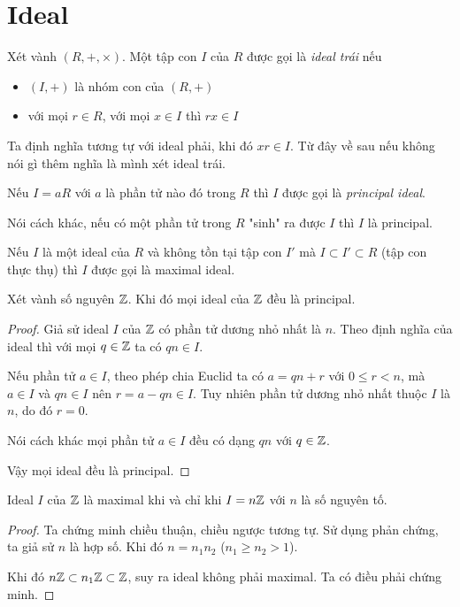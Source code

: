 \section{Ideal}

\begin{definition}[Ideal]
    Xét vành $(R, +, \times)$. Một tập con $I$ của $R$ được gọi là 
    \textit{ideal trái} nếu
    \begin{itemize}
        \item $(I, +)$ là nhóm con của $(R, +)$
        \item với mọi $r \in R$, với mọi $x \in I$ thì $rx \in I$
    \end{itemize}
\end{definition}

Ta định nghĩa tương tự với ideal phải, khi đó $xr \in I$.
Từ đây về sau nếu không nói gì thêm nghĩa là mình xét ideal trái.

\begin{definition}
    Nếu $I = aR$ với $a$ là phần tử nào đó trong $R$ thì $I$ được gọi 
    là  \textit{principal ideal}.
\end{definition}

Nói cách khác, nếu có một phần tử trong $R$ "sinh" ra được $I$ thì 
$I$ là principal.

\begin{definition}
    Nếu $I$ là một ideal của $R$ và không tồn tại tập con $I'$ mà 
    $I \subset I' \subset R$ (tập con thực thụ) thì $I$ được gọi
    là maximal ideal.
\end{definition}

\begin{corollary}
    Xét vành số nguyên $\mathbb{Z}$. Khi đó mọi ideal của $\mathbb{Z}$ đều là principal.
\end{corollary}

\begin{proof}
    Giả sử ideal $I$ của $\mathbb{Z}$ có phần tử dương nhỏ nhất là $n$.
    Theo định nghĩa của ideal thì với mọi $q \in \mathbb{Z}$ ta có 
    $qn \in I$.

    Nếu phần tử $a \in I$, theo phép chia Euclid ta có $a = qn + r$
    với $0 \leq r < n$, mà $a \in I$ và $qn \in I$ nên $r = a - qn \in I$.
    Tuy nhiên phần tử dương nhỏ nhất thuộc $I$ là $n$, do đó $r = 0$.

    Nói cách khác mọi phần tử $a \in I$ đều có dạng $qn$ với $q \in \mathbb{Z}$.

    Vậy mọi ideal đều là principal.
\end{proof}

\begin{corollary}
    Ideal $I$ của $\mathbb{Z}$ là maximal khi và chỉ khi $I = n\mathbb{Z}$ với
    $n$ là số nguyên tố.
\end{corollary}

\begin{proof}
    Ta chứng minh chiều thuận, chiều ngược tương tự. Sử dụng phản chứng,
    ta giả sử $n$ là hợp số. Khi đó $n = n_1 n_2$ ($n_1 \geq n_2 > 1$).

    Khi đó $n \mathbb{Z} \subset n_1 \mathbb{Z} \subset \mathbb{Z}$, suy ra ideal không phải
    maximal. Ta có điều phải chứng minh.
\end{proof}